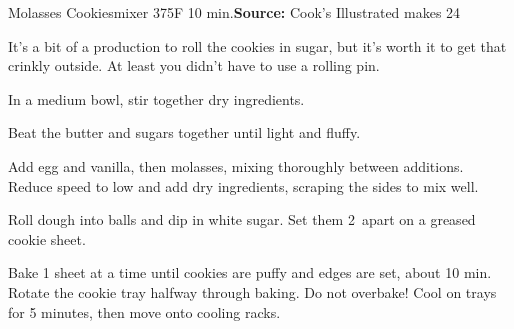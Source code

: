 \begin{recipe}{Molasses Cookies}{mixer \hfill 375\0F \hfill 10 min.}{\textbf{Source:} Cook's Illustrated \hfill makes 24}

 \freeform It's a bit of a production to roll the cookies in sugar, but it's worth it to get that crinkly outside. At least you didn't have to use a rolling pin.

 In a medium bowl, stir together dry ingredients.

 Beat the butter and sugars together until light and fluffy.

 Add egg and vanilla, then molasses, mixing thoroughly between additions. Reduce speed to low and add dry ingredients, scraping the sides to mix well.

 \newstep Roll dough into balls and dip in white sugar. Set them 2\inch\ apart on a greased cookie sheet.

 \newstep Bake 1 sheet at a time until cookies are puffy and edges are set, about 10 min. Rotate the cookie tray halfway through baking. Do not overbake! Cool on trays for 5 minutes, then move onto cooling racks.
\end{recipe}

